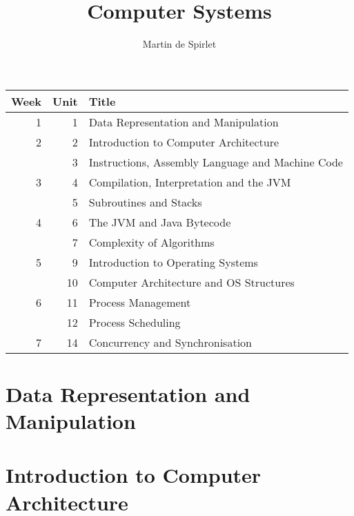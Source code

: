 \documentclass[
  11pt,
  a4paper,
]{article}
\title{Computer Systems}
\author{Martin de Spirlet}
\date{}
\begin{document}

\maketitle

\vspace*{\fill}

\begin{table}[htp]
  \centering
  \begin{tabular}{rrl}
    \toprule
    Week & Unit & Title \\
    \midrule
     1 &  1 & Data Representation and Manipulation \\[1ex]
     2 &  2 & Introduction to Computer Architecture \\
       &  3 & Instructions, Assembly Language and Machine Code \\[1ex]
     3 &  4 & Compilation, Interpretation and the JVM \\
       &  5 & Subroutines and Stacks \\[1ex]
     4 &  6 & The JVM and Java Bytecode \\
       &  7 & Complexity of Algorithms \\[1ex]
     5 &  9 & Introduction to Operating Systems \\
       & 10 & Computer Architecture and OS Structures \\[1ex]
     6 & 11 & Process Management \\
       & 12 & Process Scheduling \\[1ex]
     7 & 14 & Concurrency and Synchronisation \\
    \bottomrule
  \end{tabular}
\end{table}

\vspace*{\fill}
\addvspace{1in}

\clearpage


\section{Data Representation and Manipulation}


\section{Introduction to Computer Architecture}

\end{document}
